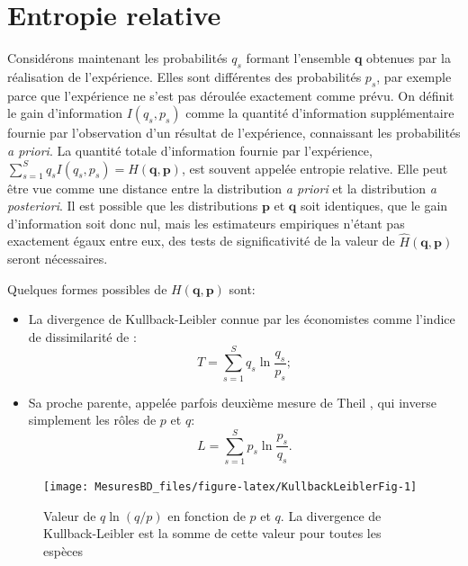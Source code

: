 \documentclass[
  11pt,
  french,
  a4paper,
  extrafontsizes,onecolumn,openright
  ]{memoir}
\providecommand{\tightlist}{%
  \setlength{\itemsep}{0pt}\setlength{\parskip}{0pt}}
\newlength{\rf}
\begin{document}
\hypertarget{entropie-relative}{%
\section{Entropie relative}\label{entropie-relative}}

Considérons maintenant les probabilités \(q_s\) formant l'ensemble \(\mathbf{q}\) obtenues par la réalisation de l'expérience.
Elles sont différentes des probabilités \(p_s\), par exemple parce que l'expérience ne s'est pas déroulée exactement comme prévu.
On définit le gain d'information \(I(q_s,p_s)\) comme la quantité d'information supplémentaire fournie par l'observation d'un résultat de l'expérience, connaissant les probabilités \emph{a priori}.
La quantité totale d'information fournie par l'expérience, \(\sum^S_{s=1}{q_sI(q_s,p_s)}=H(\mathbf{q},\mathbf{p})\), est souvent appelée entropie relative.
Elle peut être vue comme une distance entre la distribution \emph{a priori} et la distribution \emph{a posteriori}.
Il est possible que les distributions \(\mathbf{p}\) et \(\mathbf{q}\) soit identiques, que le gain d'information soit donc nul, mais les estimateurs empiriques n'étant pas exactement égaux entre eux, des tests de significativité de la valeur de \(\hat{H}(\mathbf{q},\mathbf{p})\) seront nécessaires.

Quelques formes possibles de \(H(\mathbf{q},\mathbf{p})\) sont:

\begin{itemize}
\tightlist
\item
  La divergence de Kullback-Leibler \autocite{Kullback1951} connue par les économistes comme l'indice de dissimilarité de \textcite{Theil1967}:
  \begin{equation}
  \label{eq:Theil}
  T = \sum^S_{s=1}{q_{s}\ln\frac{q_s}{p_s}};
  \end{equation}
\item
  Sa proche parente, appelée parfois deuxième mesure de Theil \autocite{Conceicao2000}, qui inverse simplement les rôles de \(p\) et \(q\):
  \begin{equation}
  \label{eq:Theil2}
  L = \sum^S_{s=1}{p_{s}\ln\frac{p_s}{q_s}}.
  \end{equation}
\end{itemize}



\scriptsize

\begin{figure}

{\centering \texttt{[image: MesuresBD\_files/figure-latex/KullbackLeiblerFig-1]} 

}

\caption{Valeur de \(q\ln(q/p)\) en fonction de \(p\) et \(q\). La divergence de Kullback-Leibler est la somme de cette valeur pour toutes les espèces}\label{fig:KullbackLeiblerFig}
\end{figure}
\end{document}
